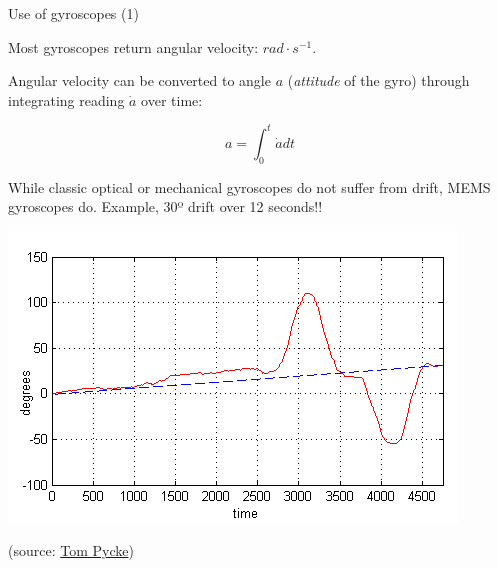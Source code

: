 \documentclass[compress]{beamer}
\begin{document}
\begin{frame}{Use of gyroscopes (1)}

Most gyroscopes return angular velocity: $rad\cdot s^{-1}$.

    Angular velocity can be converted to angle $a$ ({\it attitude} of the gyro) through integrating reading $\dot{a}$ over time:

    \[
        a = \int_{0}^{t} \dot{a}dt
    \]


    \begin{multicols}{2}
    While classic optical or mechanical gyroscopes do not suffer from drift,
    MEMS gyroscopes do. Example, 30º drift over 12 seconds!!

    \begin{center}
        \includegraphics[width=0.8\linewidth]{gyro-drift}
    \end{center}

    \end{multicols}

    (source: \href{http://tom.pycke.be/mav/70/gyroscope-to-roll-pitch-and-yaw}{Tom
    Pycke})

\end{frame}
\end{document}
